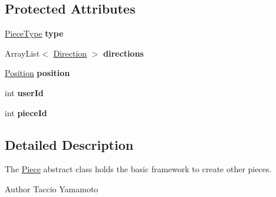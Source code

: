 \subsection*{Protected Attributes}
\begin{DoxyCompactItemize}
\item 
\hypertarget{classPiece_1_1Piece_aef3e387cd4af069c11b79080277401ff}{\hyperlink{enumPiece_1_1PieceType}{Piece\-Type} {\bfseries type}}\label{classPiece_1_1Piece_aef3e387cd4af069c11b79080277401ff}

\item 
\hypertarget{classPiece_1_1Piece_a7dc5ee3e3ea24a06c64646c927e40bfc}{Array\-List$<$ \hyperlink{classUtil_1_1Direction}{Direction} $>$ {\bfseries directions}}\label{classPiece_1_1Piece_a7dc5ee3e3ea24a06c64646c927e40bfc}

\item 
\hypertarget{classPiece_1_1Piece_a3fc7e39dc11ab214343a206dd002ccf1}{\hyperlink{classUtil_1_1Position}{Position} {\bfseries position}}\label{classPiece_1_1Piece_a3fc7e39dc11ab214343a206dd002ccf1}

\item 
\hypertarget{classPiece_1_1Piece_a5d4b62acd84f4a63b077ef9b36c49ab3}{int {\bfseries user\-Id}}\label{classPiece_1_1Piece_a5d4b62acd84f4a63b077ef9b36c49ab3}

\item 
\hypertarget{classPiece_1_1Piece_a595bb2e4e1276b86905f06518793d423}{int {\bfseries piece\-Id}}\label{classPiece_1_1Piece_a595bb2e4e1276b86905f06518793d423}

\end{DoxyCompactItemize}


\subsection{Detailed Description}
The \hyperlink{classPiece_1_1Piece}{Piece} abstract class holds the basic framework to create other pieces. \begin{DoxyAuthor}{Author}
Taccio Yamamoto 
\end{DoxyAuthor}


